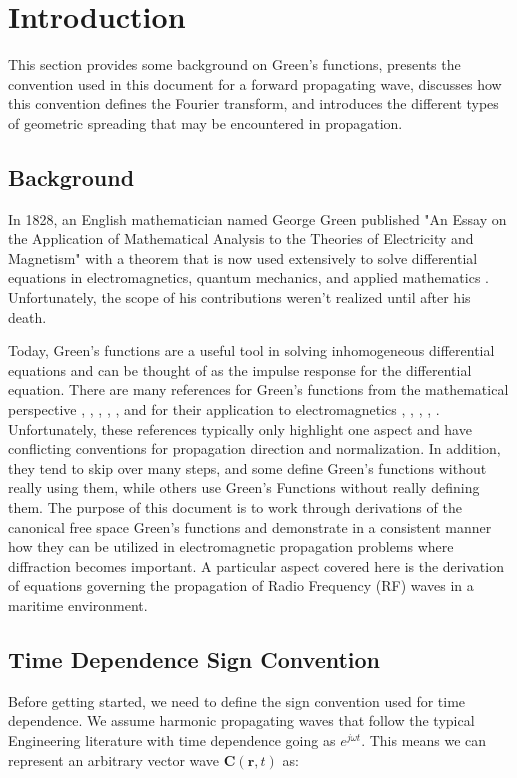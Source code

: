 \section{Introduction}
This section provides some background on Green’s functions, presents the convention used in this document for a forward propagating wave, discusses how this convention defines the Fourier transform, and introduces the different types of geometric spreading that may be encountered in propagation.

\subsection{Background}
In 1828, an English mathematician named George Green published "An Essay on the Application of Mathematical Analysis to the Theories of Electricity and Magnetism" with a theorem that is now used extensively to solve differential equations in electromagnetics, quantum mechanics, and applied mathematics \cite{green_phys_today}. Unfortunately, the scope of his contributions weren’t realized until after his death. 

Today, Green's functions are a useful tool in solving inhomogeneous differential equations and can be thought of as the impulse response for the differential equation. There are many references for Green's functions from the mathematical perspective \cite{bender_orszag}, \cite{arfken_weber}, \cite{gbur_math}, \cite{guenther_partial_de}, \cite{duffy_green}, and for their application to electromagnetics \cite{jackson_classical_em}, \cite{zangwill_modern_em}, \cite{balanis_advanced}, \cite{goodman_fourier}, \cite{smith_radiation}. Unfortunately, these references typically only highlight one aspect and have conflicting conventions for propagation direction and normalization. In addition, they tend to skip over many steps, and some define Green's functions without really using them, while others use Green’s Functions without really defining them. The purpose of this document is to work through derivations of the canonical free space Green's functions and demonstrate in a consistent manner how they can be utilized in electromagnetic propagation problems where diffraction becomes important. A particular aspect covered here is the derivation of equations governing the propagation of Radio Frequency (RF) waves in a maritime environment.

\subsection{Time Dependence Sign Convention} \label{gf_sec:time_dependence}
Before getting started, we need to define the sign convention used for time dependence. We  assume harmonic propagating waves that follow the typical Engineering literature with time dependence going as $e^{j\omega t}$. This means we can represent an arbitrary vector wave $\mathbf{C}(\mathbf{r},t)$ as:

